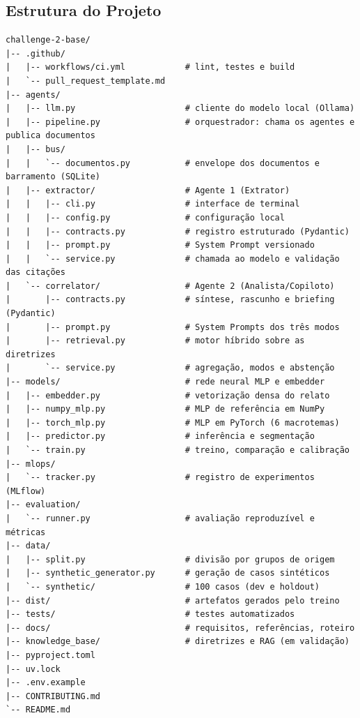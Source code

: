 \documentclass[12pt,a4paper]{article}
\begin{document}
\subsection{Estrutura do Projeto}
\begin{verbatim}
challenge-2-base/
|-- .github/
|   |-- workflows/ci.yml            # lint, testes e build
|   `-- pull_request_template.md
|-- agents/
|   |-- llm.py                      # cliente do modelo local (Ollama)
|   |-- pipeline.py                 # orquestrador: chama os agentes e publica documentos
|   |-- bus/
|   |   `-- documentos.py           # envelope dos documentos e barramento (SQLite)
|   |-- extractor/                  # Agente 1 (Extrator)
|   |   |-- cli.py                  # interface de terminal
|   |   |-- config.py               # configuração local
|   |   |-- contracts.py            # registro estruturado (Pydantic)
|   |   |-- prompt.py               # System Prompt versionado
|   |   `-- service.py              # chamada ao modelo e validação das citações
|   `-- correlator/                 # Agente 2 (Analista/Copiloto)
|       |-- contracts.py            # síntese, rascunho e briefing (Pydantic)
|       |-- prompt.py               # System Prompts dos três modos
|       |-- retrieval.py            # motor híbrido sobre as diretrizes
|       `-- service.py              # agregação, modos e abstenção
|-- models/                         # rede neural MLP e embedder
|   |-- embedder.py                 # vetorização densa do relato
|   |-- numpy_mlp.py                # MLP de referência em NumPy
|   |-- torch_mlp.py                # MLP em PyTorch (6 macrotemas)
|   |-- predictor.py                # inferência e segmentação
|   `-- train.py                    # treino, comparação e calibração
|-- mlops/
|   `-- tracker.py                  # registro de experimentos (MLflow)
|-- evaluation/
|   `-- runner.py                   # avaliação reproduzível e métricas
|-- data/
|   |-- split.py                    # divisão por grupos de origem
|   |-- synthetic_generator.py      # geração de casos sintéticos
|   `-- synthetic/                  # 100 casos (dev e holdout)
|-- dist/                           # artefatos gerados pelo treino
|-- tests/                          # testes automatizados
|-- docs/                           # requisitos, referências, roteiro
|-- knowledge_base/                 # diretrizes e RAG (em validação)
|-- pyproject.toml
|-- uv.lock
|-- .env.example
|-- CONTRIBUTING.md
`-- README.md
\end{verbatim}
\end{document}
